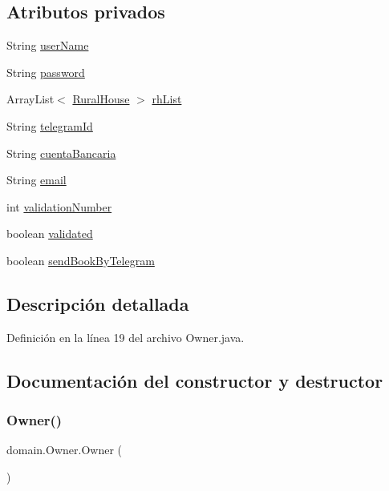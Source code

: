 \subsection*{Atributos privados}
\begin{DoxyCompactItemize}
\item 
String \mbox{\hyperlink{classdomain_1_1_owner_aa8031c9e66a0cbd90d84dc6df66a25a3}{user\+Name}}
\item 
String \mbox{\hyperlink{classdomain_1_1_owner_af66aee27508c675e6f8cab193f0c215d}{password}}
\item 
Array\+List$<$ \mbox{\hyperlink{classdomain_1_1_rural_house}{Rural\+House}} $>$ \mbox{\hyperlink{classdomain_1_1_owner_afcb9d273bad9eff1c21fcc0f8be6611a}{rh\+List}}
\item 
String \mbox{\hyperlink{classdomain_1_1_owner_a7df022fa9c33f9661d4eac42d113585c}{telegram\+Id}}
\item 
String \mbox{\hyperlink{classdomain_1_1_owner_a0c0b7f7134349132b180d90c57181561}{cuenta\+Bancaria}}
\item 
String \mbox{\hyperlink{classdomain_1_1_owner_a37fce65d727c0c7d4fbc7d2c2493148c}{email}}
\item 
int \mbox{\hyperlink{classdomain_1_1_owner_a9d429221bf395775b4dceafc96a4658b}{validation\+Number}}
\item 
boolean \mbox{\hyperlink{classdomain_1_1_owner_adec75a99c7addadf2226be54e9255ca8}{validated}}
\item 
boolean \mbox{\hyperlink{classdomain_1_1_owner_a134e9113c7b9ebcc36663b40d2415089}{send\+Book\+By\+Telegram}}
\end{DoxyCompactItemize}


\subsection{Descripción detallada}


Definición en la línea 19 del archivo Owner.\+java.



\subsection{Documentación del constructor y destructor}
\mbox{\label{classdomain_1_1_owner_a2938f239b0a7088763c81266146d8f3f}} 
\subsubsection{\texorpdfstring{Owner()}{Owner()}\hspace{0.1cm}{\footnotesize\ttfamily [1/2]}}
{\footnotesize\ttfamily domain.\+Owner.\+Owner (\begin{DoxyParamCaption}{ }\end{DoxyParamCaption})}



